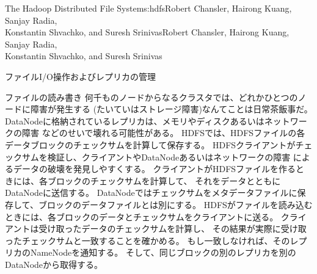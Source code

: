 \begin{aosachaptertoc}{The Hadoop Distributed File System}{s:hdfs}{Robert Chansler, Hairong Kuang, Sanjay Radia, \\ Konstantin Shvachko, and Suresh Srinivas}{Robert Chansler, Hairong Kuang, Sanjay Radia, \\ \hspace*{0.9cm} Konstantin Shvachko, and Suresh Srinivas}
\begin{aosasect1}{ファイルI/O操作およびレプリカの管理}
\begin{aosasect2}{ファイルの読み書き}
何千ものノードからなるクラスタでは、どれかひとつのノードに障害が発生する
(たいていはストレージ障害)なんてことは日常茶飯事だ。
DataNodeに格納されているレプリカは、メモリやディスクあるいはネットワークの障害
などのせいで壊れる可能性がある。
HDFSでは、HDFSファイルの各データブロックのチェックサムを計算して保存する。
HDFSクライアントがチェックサムを検証し、クライアントやDataNodeあるいはネットワークの障害
によるデータの破壊を発見しやすくする。
クライアントがHDFSファイルを作るときには、各ブロックのチェックサムを計算して、
それをデータとともにDataNodeに送信する。
DataNodeではチェックサムをメタデータファイルに保存して、ブロックのデータファイルとは別にする。
HDFSがファイルを読み込むときには、各ブロックのデータとチェックサムをクライアントに送る。
クライアントは受け取ったデータのチェックサムを計算し、
その結果が実際に受け取ったチェックサムと一致することを確かめる。
もし一致しなければ、そのレプリカのNameNodeを通知する。
そして、同じブロックの別のレプリカを別のDataNodeから取得する。


\end{aosasect2}
\end{aosasect1}
\end{aosachaptertoc}
